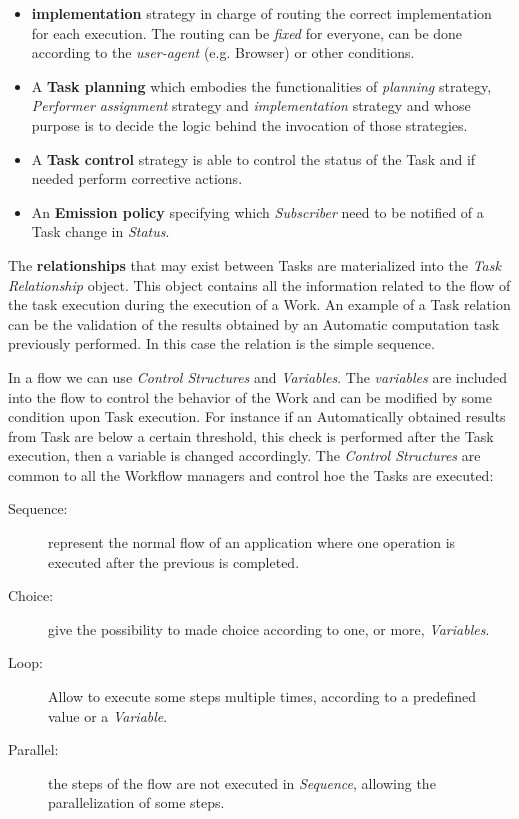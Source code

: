 \begin{itemize}
    \item \textbf{\utask{} implementation} strategy in charge of routing the
    correct \utask{} implementation for each \utask{} execution. The routing
    can be \emph{fixed} for everyone, can be done according to the
    \emph{user-agent} (e.g. Browser) or other conditions.

    \item A \textbf{Task planning} which embodies the functionalities of
    \emph{\utask{} planning} strategy, \emph{Performer assignment} strategy and
    \emph{\utask{} implementation} strategy and whose purpose is to decide the 
    logic behind the invocation of those strategies.

    \item A \textbf{Task control} strategy is able to control the status of the
    Task and if needed perform corrective actions.

    \item An \textbf{Emission policy} specifying which \emph{Subscriber} need to
    be notified of a Task change in \emph{Status}.
\end{itemize}


The \textbf{relationships} that may exist between Tasks are materialized into the
\emph{Task Relationship} object. This object contains all the information related
to the flow of the task execution during the execution of a Work. An example of
a Task relation can be the validation of the results obtained by an Automatic
computation task previously performed. In this case the relation is the simple
sequence.

In a flow we can use \emph{Control Structures} and \emph{Variables}. The
\emph{variables} are included into the flow to control the behavior of the Work
and can be modified by some condition upon Task execution. For instance if an
Automatically obtained results from Task are below a certain threshold, this
check is performed after the Task execution, then a variable is changed accordingly.
The \emph{Control Structures} are common to all the Workflow managers and 
control hoe the Tasks are executed:
\begin{description}
     \item[Sequence:] represent the normal flow of an application where one
     operation is executed after the previous is completed.
     \item[Choice:] give the possibility to made choice according to one, or
     more, \emph{Variables}.
     \item[Loop:] Allow to execute some steps multiple times, according to a
     predefined value or a \emph{Variable}.
     \item[Parallel:] the steps of the flow are not executed in \emph{Sequence},
     allowing the parallelization of some steps.
 \end{description} 









